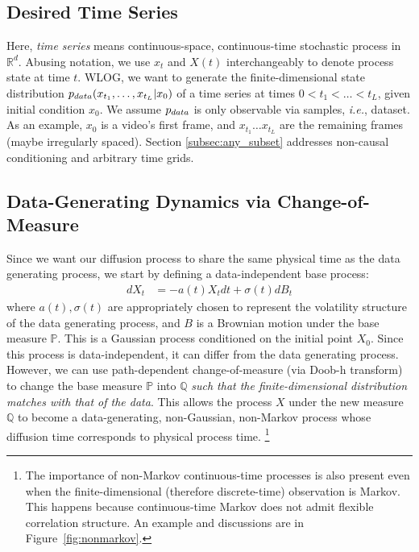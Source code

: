 \documentclass{article}
\newcommand{\pdata}{p_{\normalfont{data}}}
\begin{document}


\subsection{Desired Time Series}
Here, \textit{time series} means continuous-space, continuous-time stochastic process in $\mathbb{R}^d$. Abusing notation, we use $x_t$ and $X(t)$ interchangeably to denote process state at time $t$.
WLOG, we want to generate the finite-dimensional %
state distribution $\pdata(x_{t_1}, \ldots, x_{t_L} | x_0)$ of a time series at times $0 < t_1 <\ldots < t_{L}$, given initial condition $x_{0}$. We assume $\pdata$ is only observable via samples, \textit{i.e.}, dataset. As an example, $x_{0}$ is a video's first frame, and $x_{t_1} \ldots x_{t_{L}}$ are the remaining frames (maybe irregularly spaced). Section \ref{subsec:any_subset} addresses non-causal conditioning and arbitrary time grids.

\subsection{Data-Generating Dynamics via Change-of-Measure}

Since we want our diffusion process to share the same physical time as the data generating process, we start by defining a data-independent base process:
\begin{align}
    dX_t &= -a(t)X_tdt + \sigma(t)dB_t \label{eqn:base_process_main}
\end{align}
where $a(t), \sigma(t)$ are appropriately chosen to represent the volatility structure of the data generating process, and $B$ is a Brownian motion under the base measure $\mathbb{P}$. This is a Gaussian process conditioned on the initial point $X_0$. Since this process is data-independent, it can differ from the data generating process. However, we can use path-dependent change-of-measure (via Doob-h transform) \cite{doob1984classical, girsanov1960transforming} to change the base measure $\mathbb{P}$ into $\mathbb{Q}$ \textit{such that the finite-dimensional distribution matches with that of the data}. This allows the process $X$ under the new measure $\mathbb{Q}$ to become a data-generating, non-Gaussian, non-Markov process whose diffusion time corresponds to physical process time. \footnote{The importance of non-Markov continuous-time processes is also present even when the finite-dimensional (therefore discrete-time) observation is Markov. This happens because continuous-time Markov does not admit flexible correlation structure. An example and discussions are in Figure~\ref{fig:nonmarkov}.} %
\end{document}
